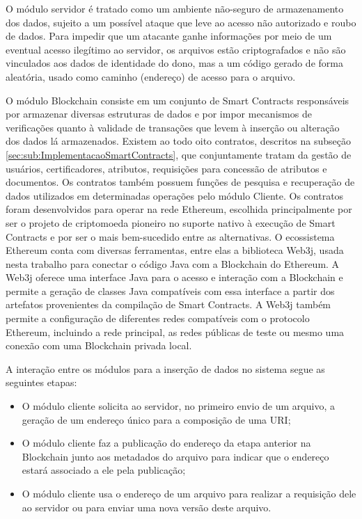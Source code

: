 \documentclass[a4paper,11pt]{article}
\begin{document}
O módulo servidor é tratado como um ambiente não-seguro de armazenamento dos dados, sujeito a um possível ataque que leve ao acesso não autorizado e roubo de dados. Para impedir que um atacante ganhe informações por meio de um eventual acesso ilegítimo ao servidor, os arquivos estão criptografados e não são vinculados aos dados de identidade do dono, mas a um código gerado de forma aleatória, usado como caminho (endereço) de acesso para o arquivo.

O módulo Blockchain consiste em um conjunto de Smart Contracts responsáveis por armazenar diversas estruturas de dados e por impor mecanismos de verificações quanto à validade de transações que levem à inserção ou alteração dos dados lá armazenados.
Existem ao todo oito contratos, descritos na subseção \ref{sec:sub:ImplementacaoSmartContracts}, que conjuntamente tratam da gestão de usuários, certificadores, atributos, requisições para concessão de atributos e documentos.
Os contratos também possuem funções de pesquisa e recuperação de dados  utilizados em determinadas operações pelo módulo Cliente. %
Os contratos foram desenvolvidos para operar na rede Ethereum, escolhida principalmente por ser o projeto de criptomoeda pioneiro no suporte nativo à execução de Smart Contracts e por ser o mais bem-sucedido entre as alternativas. %
O ecossistema Ethereum conta com diversas ferramentas, entre elas a biblioteca Web3j, usada nesta trabalho para conectar o código Java com a Blockchain do Ethereum.
A Web3j oferece uma interface Java para o acesso e interação com a Blockchain e permite a geração de classes Java compatíveis com essa interface a partir dos artefatos provenientes da compilação de Smart Contracts.
A Web3j também permite a configuração de diferentes redes compatíveis com o protocolo Ethereum, incluindo a rede principal, as redes públicas de teste ou mesmo uma conexão com uma Blockchain privada local.

A interação entre os módulos para a inserção de dados no sistema segue as seguintes etapas:
\begin{itemize}
  \item O módulo cliente solicita ao servidor, no primeiro envio de um arquivo, a geração de um endereço único para a composição de uma URI;
  \item O módulo cliente faz a publicação do endereço da etapa anterior na Blockchain junto aos metadados do arquivo para indicar que o endereço estará associado a ele pela publicação; %
  \item O módulo cliente usa o endereço de um arquivo para realizar a requisição dele ao servidor ou para enviar uma nova versão deste arquivo.
\end{itemize}
\end{document}
